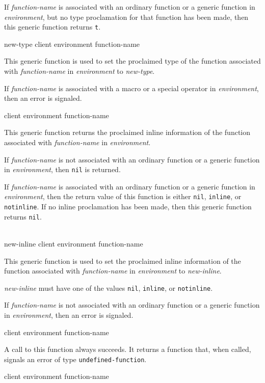 If \textit{function-name} is associated with an ordinary function or a
generic function in \textit{environment}, but no type proclamation for
that function has been made, then this generic function returns
\texttt{t}.

 {new-type client environment function-name}

This generic function is used to set the proclaimed type of the
function associated with \textit{function-name} in
\textit{environment} to \textit{new-type}.

If \textit{function-name} is associated with a macro or a special
operator in \textit{environment}, then an error is signaled.

 {client environment function-name}

This generic function returns the proclaimed inline information of the
function associated with \textit{function-name} in
\textit{environment}.

If \textit{function-name} is not associated with an ordinary function
or a generic function in \textit{environment}, then \texttt{nil} is
returned.

If \textit{function-name} is associated with an ordinary function or a
generic function in \textit{environment}, then the return value of
this function is either \texttt{nil}, \texttt{inline}, or
\texttt{notinline}.  If no inline proclamation has been made, then
this generic function returns \texttt{nil}.

\\
{new-inline client environment function-name}

This generic function is used to set the proclaimed inline information
of the function associated with \textit{function-name} in
\textit{environment} to \textit{new-inline}.

\textit{new-inline} must have one of the values \texttt{nil},
\texttt{inline}, or \texttt{notinline}.

If \textit{function-name} is not associated with an ordinary function
or a generic function in \textit{environment}, then an error is
signaled.

 {client environment function-name}

A call to this function always succeeds.  It returns a function that, when
called, signals an error of type \texttt{undefined-function}.

 {client environment function-name}


